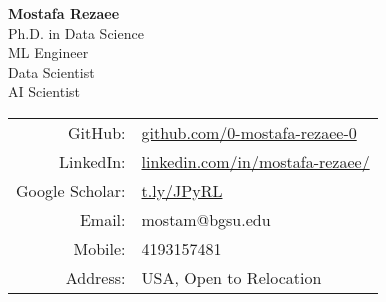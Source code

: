 \documentclass[11pt]{article} %
\begin{document}
\begin{center}
	\begin{minipage}{0.45\textwidth}
		{\Huge\bfseries
			Mostafa Rezaee  %
		} \\ \medskip
		Ph.D. in Data Science \\ %
		ML Engineer \\
		Data Scientist \\
		AI Scientist 
	\end{minipage} \hfill
	\begin{minipage}{0.48\textwidth}
		\begin{tabular}{rl}
			GitHub: & \href{https://github.com/0-mostafa-rezaee-0}{github.com/0-mostafa-rezaee-0} \\
			LinkedIn: & \href{https://www.linkedin.com/in/mostafa-rezaee/}{linkedin.com/in/mostafa-rezaee/} \\
			Google Scholar: & \href{https://scholar.google.com/citations?user=jvcCIJYAAAAJ&hl=en}{t.ly/JPyRL} \\
			Email: & mostam@bgsu.edu \\
			Mobile: & 4193157481 \\
			Address: & USA, Open to Relocation
		\end{tabular}
	\end{minipage}
\end{center}

\end{document}
